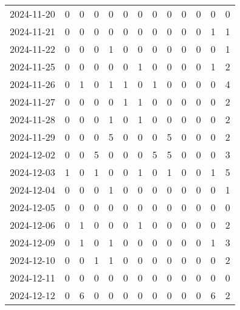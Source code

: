 \documentclass[dvipdfmx,oneside]{article}
\begin{document}
\begin{longtable}{lcccccccccccc}
        2024-11-20 &     0 &     0 &     0 &     0 &     0 &     0 &     0 &     0 &     0 &     0 &     0 &      0 \\
        2024-11-21 &     0 &     0 &     0 &     0 &     0 &     0 &     0 &     0 &     0 &     0 &     1 &      1 \\
        2024-11-22 &     0 &     0 &     0 &     1 &     0 &     0 &     0 &     0 &     0 &     0 &     0 &      1 \\
        2024-11-25 &     0 &     0 &     0 &     0 &     0 &     1 &     0 &     0 &     0 &     0 &     1 &      2 \\
        2024-11-26 &     0 &     1 &     0 &     1 &     1 &     0 &     1 &     0 &     0 &     0 &     0 &      4 \\
        2024-11-27 &     0 &     0 &     0 &     0 &     1 &     1 &     0 &     0 &     0 &     0 &     0 &      2 \\
        2024-11-28 &     0 &     0 &     0 &     1 &     0 &     1 &     0 &     0 &     0 &     0 &     0 &      2 \\
        2024-11-29 &     0 &     0 &     0 &     5 &     0 &     0 &     0 &     5 &     0 &     0 &     0 &      2 \\
        2024-12-02 &     0 &     0 &     5 &     0 &     0 &     0 &     5 &     5 &     0 &     0 &     0 &      3 \\
        2024-12-03 &     1 &     0 &     1 &     0 &     0 &     1 &     0 &     1 &     0 &     0 &     1 &      5 \\
        2024-12-04 &     0 &     0 &     0 &     1 &     0 &     0 &     0 &     0 &     0 &     0 &     0 &      1 \\
        2024-12-05 &     0 &     0 &     0 &     0 &     0 &     0 &     0 &     0 &     0 &     0 &     0 &      0 \\
        2024-12-06 &     0 &     1 &     0 &     0 &     0 &     1 &     0 &     0 &     0 &     0 &     0 &      2 \\
        2024-12-09 &     0 &     1 &     0 &     1 &     0 &     0 &     0 &     0 &     0 &     0 &     1 &      3 \\
        2024-12-10 &     0 &     0 &     1 &     1 &     0 &     0 &     0 &     0 &     0 &     0 &     0 &      2 \\
        2024-12-11 &     0 &     0 &     0 &     0 &     0 &     0 &     0 &     0 &     0 &     0 &     0 &      0 \\
        2024-12-12 &     0 &     6 &     0 &     0 &     0 &     0 &     0 &     0 &     0 &     0 &     6 &      2 \\

\end{longtable}
\end{document}
